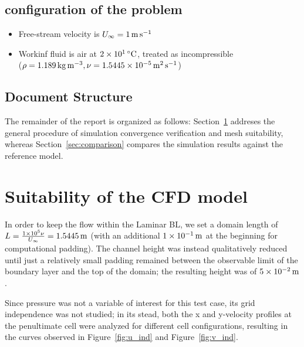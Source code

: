 \documentclass[12pt]{article}
\begin{document}
        \subsection{configuration of the problem}

                \begin{itemize}
                        \item Free-stream velocity is \( U_\infty = \SI{1E0}{\metre \per \second} \)
                        \item Workinf fluid is air at \( \SI{2E1}{\celsius} \), treated as incompressible\\(\( \rho = \SI{1.189}{\kilogram \per \metre \cubed} , \nu = \SI{1.5445E-5}{\metre \squared \per \second} \))
                \end{itemize}

        \subsection{Document Structure}

                The remainder of the report is organized as follows: Section~\ref{sec:suitability} addreses the general procedure of simulation convergence verification and mesh suitability, whereas Section~\ref{sec:comparison} compares the simulation results against the reference model.

\section{Suitability of the CFD model} \label{sec:suitability}

        In order to keep the flow within the Laminar BL, we set a domain length of \( L = \frac{\num{1E5} \nu}{U_\infty} = \SI{1.5445}{\metre} \) (with an additional \( \SI{1E-1}{\metre} \) at the beginning for computational padding). The channel height was instead qualitatively reduced until just a relatively small padding remained between the observable limit of the boundary layer and the top of the domain; the resulting height was of \( \SI{5E-2}{\metre} \).

        Since pressure was not a variable of interest for this test case, its grid independence was not studied; in its stead, both the x and y-velocity profiles at the penultimate cell were analyzed for different cell configurations, resulting in the curves observed in Figure~\ref{fig:u_ind} and Figure~\ref{fig:v_ind}.
\end{document}
